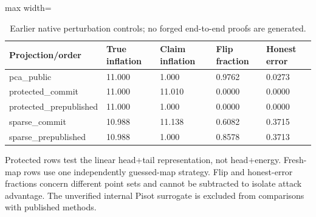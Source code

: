 \begin{table}[!htbp]
\caption{Earlier native perturbation controls; no forged end-to-end proofs are generated.}\label{tab:attack-controls}
\centering\scriptsize
\begin{adjustbox}{max width=\textwidth}
\begin{tabular}{@{}lllll@{}}
\toprule
Projection/order & True inflation & Claim inflation & Flip fraction & Honest error \\
\midrule
pca\_public & 11.000 & 1.000 & 0.9762 & 0.0273 \\
protected\_commit & 11.000 & 11.010 & 0.0000 & 0.0000 \\
protected\_prepublished & 11.000 & 1.000 & 0.0000 & 0.0000 \\
sparse\_commit & 10.988 & 11.138 & 0.6082 & 0.3715 \\
sparse\_prepublished & 10.988 & 1.000 & 0.8578 & 0.3713 \\
\bottomrule
\end{tabular}
\end{adjustbox}
\par\smallskip
\begin{minipage}{\textwidth}\scriptsize Protected rows test the linear head+tail representation, not head+energy. Fresh-map rows use one independently guessed-map strategy. Flip and honest-error fractions concern different point sets and cannot be subtracted to isolate attack advantage. The unverified internal Pisot surrogate is excluded from comparisons with published methods.\end{minipage}
\end{table}
